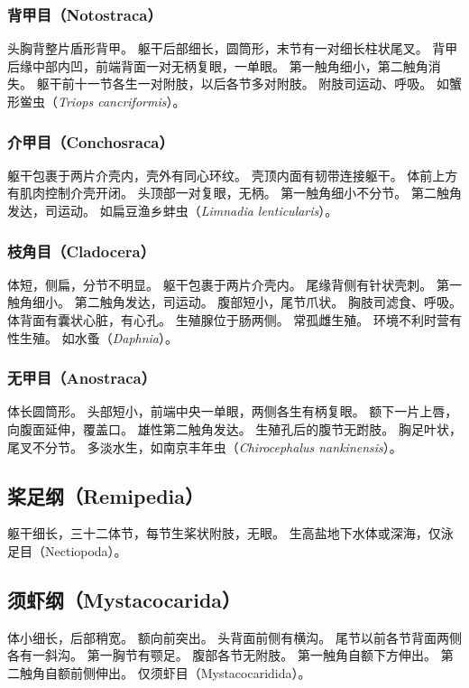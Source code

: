 \documentclass[11pt]{article}
\begin{document}
\subsubsection{背甲目（Notostraca）}
头胸背整片盾形背甲。
躯干后部细长，圆筒形，末节有一对细长柱状尾叉。
背甲后缘中部内凹，前端背面一对无柄复眼，一单眼。
第一触角细小，第二触角消失。
躯干前十一节各生一对附肢，以后各节多对附肢。
附肢司运动、呼吸。
如蟹形鲎虫（\textit{Triops cancriformis}）。

\subsubsection{介甲目（Conchosraca）}
躯干包裹于两片介壳内，壳外有同心环纹。
壳顶内面有韧带连接躯干。
体前上方有肌肉控制介壳开闭。
头顶部一对复眼，无柄。
第一触角细小不分节。
第二触角发达，司运动。
如扁豆渔乡蚌虫（\textit{Limnadia lenticularis}）。

\subsubsection{枝角目（Cladocera）}
体短，侧扁，分节不明显。
躯干包裹于两片介壳内。
尾缘背侧有针状壳刺。
第一触角细小。
第二触角发达，司运动。
腹部短小，尾节爪状。
胸肢司滤食、呼吸。
体背面有囊状心脏，有心孔。
生殖腺位于肠两侧。
常孤雌生殖。
环境不利时营有性生殖。
如水蚤（\textit{Daphnia}）。

\subsubsection{无甲目（Anostraca）}
体长圆筒形。
头部短小，前端中央一单眼，两侧各生有柄复眼。
额下一片上唇，向腹面延伸，覆盖口。
雄性第二触角发达。
生殖孔后的腹节无跗肢。
胸足叶状，尾叉不分节。
多淡水生，如南京丰年虫（\textit{Chirocephalus nankinensis}）。

\subsection{桨足纲（Remipedia）}
躯干细长，三十二体节，每节生桨状附肢，无眼。
生高盐地下水体或深海，仅泳足目（Nectiopoda）。

\subsection{须虾纲（Mystacocarida）}
体小细长，后部稍宽。
额向前突出。
头背面前侧有横沟。
尾节以前各节背面两侧各有一斜沟。
第一胸节有颚足。
腹部各节无附肢。
第一触角自额下方伸出。
第二触角自额前侧伸出。
仅须虾目（Mystacocaridida）。
\end{document}
